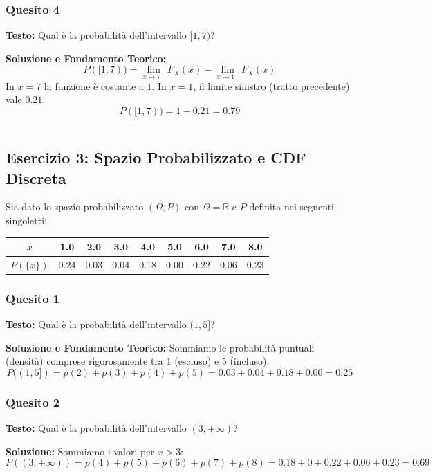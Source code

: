 \documentclass[12pt, a4paper]{article}
\begin{document}
\subsubsection*{Quesito 4}
\textbf{Testo:} Qual è la probabilità dell'intervallo $[1, 7)$?

\textbf{Soluzione e Fondamento Teorico:} 
$$ P([1, 7)) = \lim_{x \to 7^-} F_X(x) - \lim_{x \to 1^-} F_X(x) $$
In $x=7$ la funzione è costante a $1$. In $x=1$, il limite sinistro (tratto precedente) vale $0.21$.
$$ P([1, 7)) = 1 - 0.21 = 0.79 $$

\vspace{0.5cm}\hrule\vspace{0.5cm}

\subsection*{Esercizio 3: Spazio Probabilizzato e CDF Discreta}
Sia dato lo spazio probabilizzato $(\Omega, P)$ con $\Omega = \mathbb{R}$ e $P$ definita nei seguenti singoletti:
\begin{center}
\begin{tabular}{c|cccccccc}
\toprule
$x$ & 1.0 & 2.0 & 3.0 & 4.0 & 5.0 & 6.0 & 7.0 & 8.0 \\
\midrule
$P(\{x\})$ & 0.24 & 0.03 & 0.04 & 0.18 & 0.00 & 0.22 & 0.06 & 0.23 \\
\bottomrule
\end{tabular}
\end{center}

\subsubsection*{Quesito 1}
\textbf{Testo:} Qual è la probabilità dell'intervallo $(1, 5]$?

\textbf{Soluzione e Fondamento Teorico:} 
Sommiamo le probabilità puntuali (densità) comprese rigorosamente tra 1 (escluso) e 5 (incluso).
$$ P((1, 5]) = p(2) + p(3) + p(4) + p(5) = 0.03 + 0.04 + 0.18 + 0.00 = 0.25 $$

\subsubsection*{Quesito 2}
\textbf{Testo:} Qual è la probabilità dell'intervallo $(3, +\infty)$?

\textbf{Soluzione:}
Sommiamo i valori per $x > 3$:
$$ P((3, +\infty)) = p(4) + p(5) + p(6) + p(7) + p(8) = 0.18 + 0 + 0.22 + 0.06 + 0.23 = 0.69 $$
\end{document}
